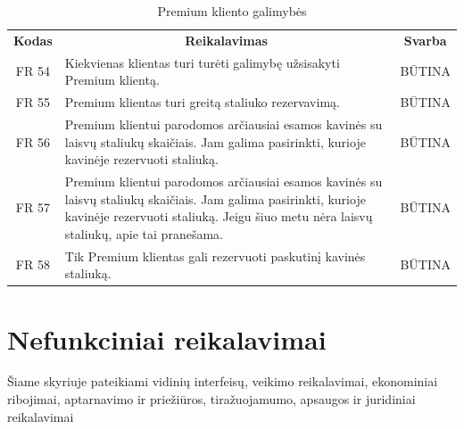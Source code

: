 \documentclass{VUMIFPSkursinis}
\begin{document}
\begin{center}
	\begin{table}[H]
	\caption{Premium kliento galimybės}
	\begin{tabular}{|p{2cm}|p{}|p{}|}
	\hline
	    \rowcolor{lightgray}
		\multicolumn{3}{|c|}{Premium kliento galimybės}\\
		
	\hline
		\multicolumn{1}{|c|}{{\bfseries Kodas}}&
		\multicolumn{1}{|c|}{{\bfseries Reikalavimas}}&
		\multicolumn{1}{|c|}{{\bfseries Svarba}}\\
	\hline 	
		\multicolumn{1}{|c|}{FR 54}&
		{Kiekvienas klientas turi turėti galimybę užsisakyti Premium klientą.}&
		\multicolumn{1}{|c|}{BŪTINA}\\
				
	\hline 	
		\multicolumn{1}{|c|}{FR 55}&
		{Premium klientas turi greitą staliuko rezervavimą.}&
		\multicolumn{1}{|c|}{BŪTINA}\\
				
	\hline 	
		\multicolumn{1}{|c|}{FR 56}&
		{Premium klientui parodomos arčiausiai esamos kavinės su laisvų staliukų skaičiais. Jam galima pasirinkti, kurioje kavinėje rezervuoti staliuką.}&
		\multicolumn{1}{|c|}{BŪTINA}\\
				
	\hline 	
		\multicolumn{1}{|c|}{FR 57}&
		{Premium klientui parodomos arčiausiai esamos kavinės su laisvų staliukų skaičiais. Jam galima pasirinkti, kurioje kavinėje rezervuoti staliuką. Jeigu šiuo metu nėra laisvų staliukų, apie tai pranešama.}&
		\multicolumn{1}{|c|}{BŪTINA}\\
				
	\hline 	
		\multicolumn{1}{|c|}{FR 58}&
		{Tik Premium klientas gali rezervuoti paskutinį kavinės staliuką.}&
		\multicolumn{1}{|c|}{BŪTINA}\\
				
	\hline

	\end{tabular}
	
	\label{table:Premiumklientogalimybės}		
	\end{table}

\end{center}

\pagebreak
\section{Nefunkciniai reikalavimai}
Šiame skyriuje pateikiami vidinių interfeisų, veikimo reikalavimai, ekonominiai ribojimai, aptarnavimo ir priežiūros, tiražuojamumo, apsaugos ir juridiniai reikalavimai
\end{document}
